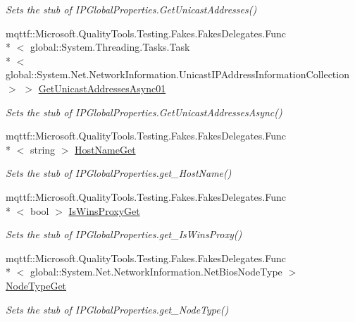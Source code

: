 \begin{DoxyCompactItemize}
\begin{DoxyCompactList}\small\item\em Sets the stub of I\-P\-Global\-Properties.\-Get\-Unicast\-Addresses()\end{DoxyCompactList}\item 
mqttf\-::\-Microsoft.\-Quality\-Tools.\-Testing.\-Fakes.\-Fakes\-Delegates.\-Func\\*
$<$ global\-::\-System.\-Threading.\-Tasks.\-Task\\*
$<$ global\-::\-System.\-Net.\-Network\-Information.\-Unicast\-I\-P\-Address\-Information\-Collection $>$ $>$ \hyperlink{class_system_1_1_net_1_1_network_information_1_1_fakes_1_1_stub_i_p_global_properties_aa64c82eebf83d5297875fd65a2bcd978}{Get\-Unicast\-Addresses\-Async01}
\begin{DoxyCompactList}\small\item\em Sets the stub of I\-P\-Global\-Properties.\-Get\-Unicast\-Addresses\-Async()\end{DoxyCompactList}\item 
mqttf\-::\-Microsoft.\-Quality\-Tools.\-Testing.\-Fakes.\-Fakes\-Delegates.\-Func\\*
$<$ string $>$ \hyperlink{class_system_1_1_net_1_1_network_information_1_1_fakes_1_1_stub_i_p_global_properties_af7d0577b0832c7aa0039246d5263753f}{Host\-Name\-Get}
\begin{DoxyCompactList}\small\item\em Sets the stub of I\-P\-Global\-Properties.\-get\-\_\-\-Host\-Name()\end{DoxyCompactList}\item 
mqttf\-::\-Microsoft.\-Quality\-Tools.\-Testing.\-Fakes.\-Fakes\-Delegates.\-Func\\*
$<$ bool $>$ \hyperlink{class_system_1_1_net_1_1_network_information_1_1_fakes_1_1_stub_i_p_global_properties_a0eba0b7245ae2c7998b10b4e5c47497f}{Is\-Wins\-Proxy\-Get}
\begin{DoxyCompactList}\small\item\em Sets the stub of I\-P\-Global\-Properties.\-get\-\_\-\-Is\-Wins\-Proxy()\end{DoxyCompactList}\item 
mqttf\-::\-Microsoft.\-Quality\-Tools.\-Testing.\-Fakes.\-Fakes\-Delegates.\-Func\\*
$<$ global\-::\-System.\-Net.\-Network\-Information.\-Net\-Bios\-Node\-Type $>$ \hyperlink{class_system_1_1_net_1_1_network_information_1_1_fakes_1_1_stub_i_p_global_properties_a72425b7e57b3861a125db3891f961614}{Node\-Type\-Get}
\begin{DoxyCompactList}\small\item\em Sets the stub of I\-P\-Global\-Properties.\-get\-\_\-\-Node\-Type()\end{DoxyCompactList}\end{DoxyCompactItemize}
